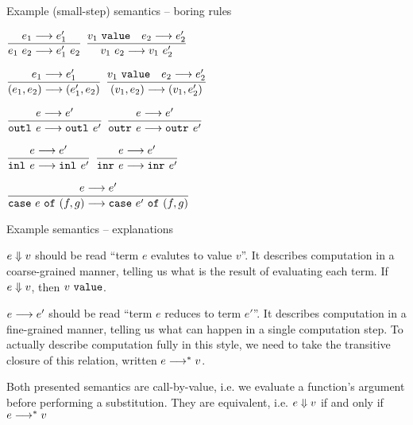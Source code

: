 \documentclass{beamer}
\begin{document}
\begin{frame}{Example (small-step) semantics -- boring rules}

\begin{center}
  $\infrule{\smallstep{e_1}{e_1'}}{\smallstep{\app{e_1}{e_2}}{\app{e_1'}{e_2}}}$ \quad
  $\infrule{\val{v_1} \quad \smallstep{e_2}{e_2'}}{\smallstep{\app{v_1}{e_2}}{\app{v_1}{e_2'}}}$

  \vspace{2em}

  $\displaystyle \frac{e_1 \longrightarrow e_1'}{(e_1, e_2) \longrightarrow (e_1', e_2)} \textsc{\footnotesize{}}$ \quad
  $\displaystyle \frac{v_1\ \texttt{value} \quad e_2 \longrightarrow e_2'}{(v_1, e_2) \longrightarrow (v_1, e_2')} \textsc{\footnotesize{}}$

  \vspace{2em}

  $\displaystyle \frac{e \longrightarrow e'}{\texttt{outl}_{}\ e \longrightarrow \texttt{outl}_{}\ e'} \textsc{\footnotesize{}}$ \quad
  $\displaystyle \frac{e \longrightarrow e'}{\texttt{outr}_{}\ e \longrightarrow \texttt{outr}_{}\ e'} \textsc{\footnotesize{}}$

  \vspace{2em}

  $\displaystyle \frac{e \longrightarrow e'}{\texttt{inl}_{}\ e \longrightarrow \texttt{inl}_{}\ e'} \textsc{\footnotesize{}}$ \quad
  $\displaystyle \frac{e \longrightarrow e'}{\texttt{inr}_{}\ e \longrightarrow \texttt{inr}_{}\ e'} \textsc{\footnotesize{}}$

  \vspace{1em}

  $\displaystyle \frac{e \longrightarrow e'}{\texttt{case}\ e\ \texttt{of}\ (f, g) \longrightarrow \texttt{case}\ e'\ \texttt{of}\ (f, g)} \textsc{\footnotesize{}}$

\end{center}

\end{frame}

\begin{frame}{Example semantics -- explanations}

$e \Downarrow v$ should be read ``term $e$ evalutes to value $v$''. It describes computation in a coarse-grained manner, telling us what is the result of evaluating each term. If $e \Downarrow v$, then $v\ \texttt{value}$.

\vspace{2em}

$e \longrightarrow e'$ should be read ``term $e$ reduces to term $e'$''. It describes computation in a fine-grained manner, telling us what can happen in a single computation step. To actually describe computation fully in this style, we need to take the transitive closure of this relation, written $e \longrightarrow^* v$.

\vspace{2em}

Both presented semantics are call-by-value, i.e. we evaluate a function's argument before performing a substitution. They are equivalent, i.e. $e \Downarrow v$ if and only if $e \longrightarrow^* v$

\end{frame}
\end{document}
